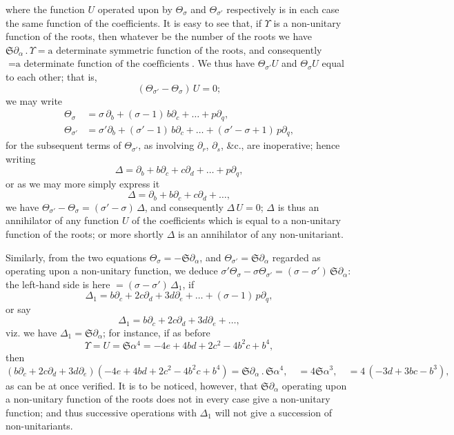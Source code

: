 \documentclass[11pt,a4paper]{book}
\begin{document}
{{{\begin{art}
where the function $U$ operated upon by $\Theta_{\sigma}$ and $\Theta_{\sigma'}$ respectively is in each case the same function of the coefficients. It is easy to see that, if $\Upsilon$ is a non-unitary function of the roots, then whatever be the number of the roots we have $\mathfrak{S}\partial_{\alpha}\,.\,\Upsilon = \text{a determinate symmetric function of the roots}$, and consequently $= \text{a determinate function of the coefficients}$. We thus have $\Theta_{\sigma'} U$ and $\Theta_{\sigma} U$ equal to each other; that is,
\[
(\Theta_{\sigma'} - \Theta_{\sigma})\, U = 0;
\]
we may write
\begin{align*}
\Theta_{\sigma} &= \sigma\,\partial_{b} + (\sigma-1)\,b\partial_{c} + \ldots + p\partial_{q},\\
\Theta_{\sigma'} &= \sigma'\partial_{b} + (\sigma'-1)\,b\partial_{c} + \ldots + (\sigma'-\sigma+1)\,p\partial_{q},
\end{align*}
for the subsequent terms of $\Theta_{\sigma'}$, as involving $\partial_{r}$, $\partial_{s}$, \&c., are inoperative; hence writing
\[
\Delta = \partial_{b} + b\partial_{c} + c\partial_{d} + \ldots + p\partial_{q},
\]
or as we may more simply express it
\[
\Delta = \partial_{b} + b\partial_{c} + c\partial_{d} + \ldots,
\]
we have $\Theta_{\sigma'} - \Theta_{\sigma} = (\sigma' - \sigma)\,\Delta$, and consequently $\Delta\, U = 0$; $\Delta$ is thus an annihilator of any function $U$ of the coefficients which is equal to a non-unitary function of the roots; or more shortly $\Delta$ is an annihilator of any non-unitariant.
\end{art}

\setcounter{art}{22}
\begin{art}
Similarly, from the two equations $\Theta_{\sigma} = -\mathfrak{S}\partial_{\alpha}$, and $\Theta_{\sigma'} = \mathfrak{S}\partial_{\alpha}$ regarded as operating upon a non-unitary function, we deduce $\sigma'\Theta_{\sigma} - \sigma\Theta_{\sigma'} = (\sigma - \sigma')\,\mathfrak{S}\partial_{\alpha}$: the left-hand side is here $= (\sigma - \sigma')\,\Delta_{1}$, if
\[
\Delta_{1} = b\partial_{c} + 2c\partial_{d} + 3d\partial_{e} + \ldots + (\sigma-1)\,p\partial_{q},
\]
or say
\[
\Delta_{1} = b\partial_{c} + 2c\partial_{d} + 3d\partial_{e} + \ldots,
\]
viz. we have $\Delta_{1} = \mathfrak{S}\partial_{\alpha}$; for instance, if as before
\[
\Upsilon = U = \mathfrak{S}\alpha^{4} = -4e + 4bd + 2c^{2} - 4b^{2}c + b^{4},
\]
then
\[
(b\partial_{c} + 2c\partial_{d} + 3d\partial_{e})(-4e + 4bd + 2c^{2} - 4b^{2}c + b^{4}) = \mathfrak{S}\partial_{\alpha}\,.\,\mathfrak{S}\alpha^{4},\quad = 4\mathfrak{S}\alpha^{3},\quad = 4\,(-3d + 3bc - b^{3}),
\]
as can be at once verified. It is to be noticed, however, that $\mathfrak{S}\partial_{\alpha}$ operating upon a non-unitary function of the roots does not in every case give a non-unitary function; and thus successive operations with $\Delta_{1}$ will not give a succession of non-unitariants.
\end{art}

}}}
\end{document}
